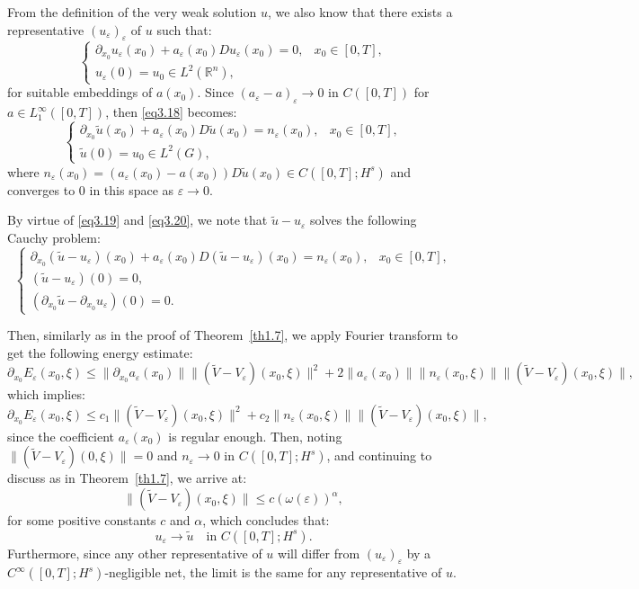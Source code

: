\documentclass[12pt]{amsart}
\theoremstyle{definition}
\begin{document}
From the definition of the very weak solution $u$, we also know that there exists a representative $(u_\varepsilon)_\varepsilon$ of $u$ such that:
\begin{equation}
\begin{cases}
\partial_{x_0} u_\varepsilon(x_0) + a_\varepsilon(x_0) D u_\varepsilon(x_0) = 0, & x_0 \in [0, T], \\
u_\varepsilon(0) = u_0 \in L^2(\mathbb{R}^n),
\end{cases}
\label{eq3.19}
\end{equation}
for suitable embeddings of $a(x_0)$. Since $(a_\varepsilon - a)_\varepsilon \to 0$ in $C([0, T])$ for $a \in L^\infty_1([0, T])$, then \eqref{eq3.18} becomes:
\begin{equation}
\begin{cases}
\partial_{x_0} \tilde{u}(x_0) + a_\varepsilon(x_0) D \tilde{u}(x_0) = n_\varepsilon(x_0), & x_0 \in [0, T], \\
\tilde{u}(0) = u_0 \in L^2(G),
\end{cases}
\label{eq3.20}
\end{equation}
where $n_\varepsilon(x_0) = (a_\varepsilon(x_0) - a(x_0)) D \tilde{u}(x_0) \in C([0, T]; H^s)$ and converges to $0$ in this space as $\varepsilon \to 0$.

By virtue of \eqref{eq3.19} and \eqref{eq3.20}, we note that $\tilde{u} - u_\varepsilon$ solves the following Cauchy problem:
\begin{equation}
\begin{cases}
\partial_{x_0} (\tilde{u} - u_\varepsilon)(x_0) + a_\varepsilon(x_0) D (\tilde{u} - u_\varepsilon)(x_0) = n_\varepsilon(x_0), & x_0 \in [0, T], \\
(\tilde{u} - u_\varepsilon)(0) = 0, \\
(\partial_{x_0} \tilde{u} - \partial_{x_0} u_\varepsilon)(0) = 0.
\end{cases}
\label{eq:3.21}
\end{equation}

Then, similarly as in the proof of Theorem~\ref{th1.7}, we apply Fourier transform to get the following energy estimate:
\[
\partial_{x_0} E_\varepsilon(x_0, \xi) \leq \|\partial_{x_0} a_\varepsilon(x_0)\| \|(\tilde{V} - V_\varepsilon)(x_0, \xi)\|^2 + 2 \|a_\varepsilon(x_0)\| \|n_\varepsilon(x_0, \xi)\| \|(\tilde{V} - V_\varepsilon)(x_0, \xi)\|,
\]
which implies:
\[
\partial_{x_0} E_\varepsilon(x_0, \xi) \leq c_1 \|(\tilde{V} - V_\varepsilon)(x_0, \xi)\|^2 + c_2 \|n_\varepsilon(x_0, \xi)\| \|(\tilde{V} - V_\varepsilon)(x_0, \xi)\|,
\]
since the coefficient $a_\varepsilon(x_0)$ is regular enough. Then, noting $\|(\tilde{V} - V_\varepsilon)(0, \xi)\| = 0$ and $n_\varepsilon \to 0$ in $C([0, T]; H^s)$, and continuing to discuss as in Theorem~\ref{th1.7}, we arrive at:
\[
\|(\tilde{V} - V_\varepsilon)(x_0, \xi)\| \leq c (\omega(\varepsilon))^\alpha,
\]
for some positive constants $c$ and $\alpha$, which concludes that:
\[
u_\varepsilon \to \tilde{u} \quad \text{in } C([0, T]; H^s) .
\]
Furthermore, since any other representative of $u$ will differ from $(u_\varepsilon)_\varepsilon$ by a $C^\infty([0, T]; H^s)$-negligible net, the limit is the same for any representative of $u$.
\end{document}
